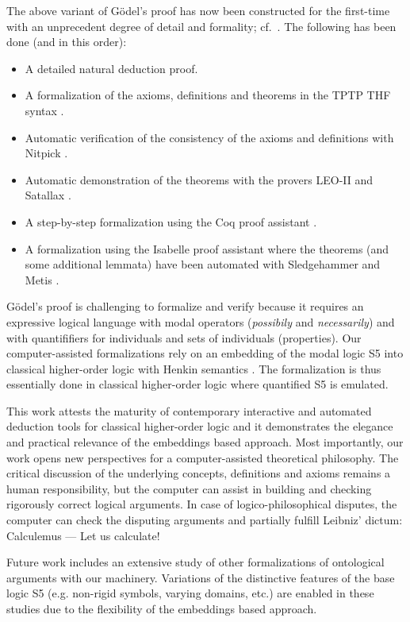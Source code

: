 \documentclass{llncs}
\begin{document}
The above variant of G\"{o}del's proof has now been 
constructed for the first-time
with an unprecedent degree of detail and formality; cf.~\cite{FormalTheologyRepository}. The following has been done (and in this order):
\begin{itemize}
\item A detailed natural deduction proof.
%
\item A formalization of the axioms, definitions and theorems in the TPTP THF syntax \cite{J22}.
%
\item Automatic verification of the consistency of the axioms and 
definitions with Nitpick \cite{Nitpick}.
%
\item Automatic demonstration of the theorems with the provers LEO-II \cite{LEO-II} and Satallax \cite{Satallax}.

\item A step-by-step formalization using the Coq proof assistant \cite{Coq}.

\item A formalization using the Isabelle proof assistant \cite{Isabelle} where the theorems (and some additional lemmata) have been automated with Sledgehammer \cite{Sledgehammer} and Metis \cite{Hurd03first-orderproof}.
\end{itemize}

G\"{o}del's proof is challenging to formalize and verify because it
requires an expressive logical language with modal operators
(\emph{possibily} and \emph{necessarily}) and with
quantififiers for individuals and sets of individuals (properties).  Our computer-assisted formalizations rely on an
embedding of the modal logic S5 into classical higher-order logic with
Henkin semantics \cite{J23,B9}. The formalization is thus essentially
done in classical higher-order logic where quantified S5 is emulated.

This work attests the maturity of contemporary interactive and
automated deduction tools for classical higher-order logic and it
demonstrates the elegance and practical relevance of the embeddings
based approach.  Most importantly, our work opens new perspectives for
a computer-assisted theoretical philosophy.  The critical discussion
of the underlying concepts, definitions and axioms remains a human
responsibility, but the computer can assist in building and checking
rigorously correct logical arguments. In case of logico-philosophical
disputes, the computer can check the disputing arguments and partially
fulfill Leibniz' dictum: Calculemus --- Let us calculate!

Future work includes an extensive study of other formalizations of
ontological arguments with our machinery. Variations of the
distinctive features of the base logic S5 (e.g. non-rigid symbols, 
varying domains, etc.) are enabled in these studies due
to the flexibility of the embeddings based approach.



\end{document}
